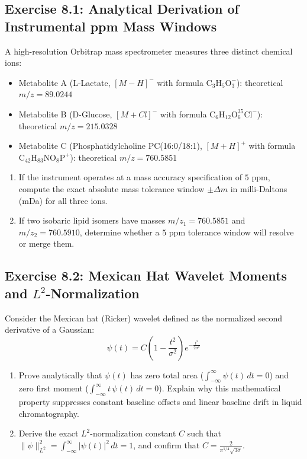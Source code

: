 \documentclass[11pt,twoside,openright]{book}
\begin{document}
\subsection*{Exercise 8.1: Analytical Derivation of Instrumental ppm Mass Windows}
A high-resolution Orbitrap mass spectrometer measures three distinct chemical ions:
\begin{itemize}
    \item Metabolite A (L-Lactate, $[M-H]^-$ with formula $\text{C}_3\text{H}_5\text{O}_3^-$): theoretical $m/z = 89.0244$
    \item Metabolite B (D-Glucose, $[M+Cl]^-$ with formula $\text{C}_6\text{H}_{12}\text{O}_6^{35}\text{Cl}^-$): theoretical $m/z = 215.0328$
    \item Metabolite C (Phosphatidylcholine PC(16:0/18:1), $[M+H]^+$ with formula $\text{C}_{42}\text{H}_{83}\text{NO}_8\text{P}^+$): theoretical $m/z = 760.5851$
\end{itemize}
\begin{enumerate}
    \item If the instrument operates at a mass accuracy specification of $5\text{ ppm}$, compute the exact absolute mass tolerance window $\pm \Delta m$ in milli-Daltons (mDa) for all three ions.
    \item If two isobaric lipid isomers have masses $m/z_1 = 760.5851$ and $m/z_2 = 760.5910$, determine whether a $5\text{ ppm}$ tolerance window will resolve or merge them.
\end{enumerate}

\subsection*{Exercise 8.2: Mexican Hat Wavelet Moments and $L^2$-Normalization}
Consider the Mexican hat (Ricker) wavelet defined as the normalized second derivative of a Gaussian:
\begin{equation*}
\psi(t) = C \left( 1 - \frac{t^2}{\sigma^2} \right) e^{-\frac{t^2}{2\sigma^2}}
\end{equation*}
\begin{enumerate}
    \item Prove analytically that $\psi(t)$ has zero total area ($\int_{-\infty}^\infty \psi(t) \, dt = 0$) and zero first moment ($\int_{-\infty}^\infty t \, \psi(t) \, dt = 0$). Explain why this mathematical property suppresses constant baseline offsets and linear baseline drift in liquid chromatography.
    \item Derive the exact $L^2$-normalization constant $C$ such that $\|\psi\|_{L^2}^2 = \int_{-\infty}^\infty |\psi(t)|^2 \, dt = 1$, and confirm that $C = \frac{2}{\pi^{1/4}\sqrt{3\sigma}}$.
\end{enumerate}
\end{document}

